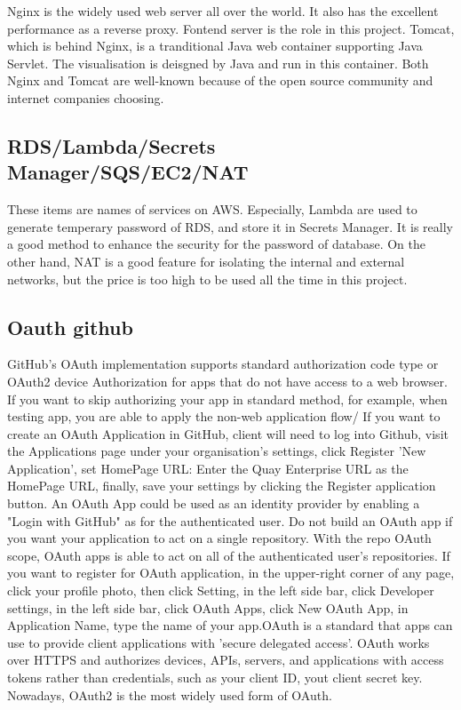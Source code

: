 \documentclass[conference]{IEEEtran}
\begin{document}
Nginx is the widely used web server all over the world. It also has the excellent performance as a reverse proxy. 
Fontend server is the role in this project. Tomcat, which is behind Nginx, is a tranditional Java web container supporting 
Java Servlet. The visualisation is deisgned by Java and run in this container. Both Nginx and Tomcat are well-known because of 
the open source community and internet companies choosing.

\subsection{RDS/Lambda/Secrets Manager/SQS/EC2/NAT}

These items are names of services on AWS. Especially, Lambda are used to generate temperary password of RDS, and store it in 
Secrets Manager. It is really a good method to enhance the security for the password of database. On the other hand, NAT is a 
good feature for isolating the internal and external networks, but the price is too high to be used all the time in this project.

\subsection{Oauth github}

GitHub's OAuth implementation supports standard authorization code type or OAuth2 device Authorization
for apps that do not have access to a web browser. If you want to skip authorizing your app in
standard method, for example, when testing app, you are able to apply the non-web application flow/
If you want to create an OAuth Application in GitHub, client will need to log into Github, visit
the Applications page under your organisation's settings, click Register 'New Application',
set HomePage URL: Enter the Quay Enterprise URL as the HomePage URL, finally, save your settings by
clicking the Register application button. An OAuth App could be used as an identity provider by enabling
a "Login with GitHub" as for the authenticated user. Do not build an OAuth app if you want your
application to act on a single repository. With the repo OAuth scope, OAuth apps is able to act on
all of the authenticated user's repositories. If you want to register for OAuth application,
in the upper-right corner of any page, click your profile photo, then click Setting, in the
left side bar, click Developer settings, in the left side bar, click OAuth Apps, click New
OAuth App, in Application Name, type the name of your app.OAuth is a standard that apps can
use to provide client applications with 'secure delegated access'. OAuth works over HTTPS and
authorizes devices, APIs, servers, and applications with access tokens rather than credentials,
such as your client ID, yout client secret key. Nowadays, OAuth2 is the most widely used form of
OAuth.
\end{document}
